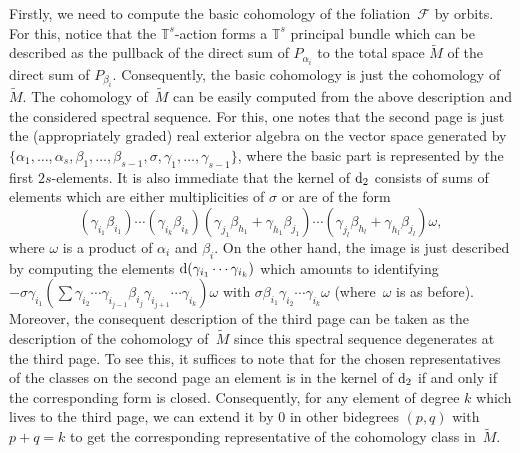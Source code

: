 \documentclass[10pt,a4paper]{amsart}
\numberwithin{equation}{section}
\theoremstyle{definition}
\begin{document}
Firstly, we need to compute the basic cohomology of the foliation~$\mathcal{F}$ by orbits. For this, notice that the $\mathbb{T}^s$-action forms a $\mathbb{T}^s$ principal bundle which can be described as the pullback of the direct sum of $P_{\alpha_i}$ to the total space $\tilde{M}$ of the direct sum of $P_{\beta_i}$. Consequently, the basic cohomology is just the cohomology of~$\tilde{M}$. The cohomology of~$\tilde{M}$ can be easily computed from the above description and the considered spectral sequence. For this, one notes that the second page is just the (appropriately graded) real exterior algebra on the vector space generated by $\{\alpha_1,\dots,\alpha_s,\beta_1,\dots,\beta_{s-1},\sigma,\gamma_1,\dots,\gamma_{s-1}\}$, where the basic part is represented by the first $2s$-elements. It is also immediate that the kernel of ${\rm d}_2$ consists of sums of elements which are either multiplicities of $\sigma$ or are of the form
\[(\gamma_{i_1}\beta_{i_1})\cdots (\gamma_{i_k}\beta_{i_k})(\gamma_{j_1}\beta_{h_1}+\gamma_{h_1}\beta_{j_1})\cdots (\gamma_{j_l}\beta_{h_l}+\gamma_{h_l}\beta_{j_l})\omega,\]
where $\omega$ is a product of $\alpha_i$ and $\beta_i$. On the other hand, the image is just described by computing the elements ${\rm d}(\gamma_{i_1}\cdots \gamma_{i_k})$ which amounts to identifying $-\sigma\gamma_{i_1}(\sum \gamma_{i_2}\cdots \gamma_{i_{j-1}}\beta_{i_j}\gamma_{i_{j+1}}\cdots \gamma_{i_k})\omega$ with $\sigma\beta_{i_1}\gamma_{i_2}\cdots \gamma_{i_k}\omega$ (where~$\omega$ is as before). Moreover, the consequent description of the third page can be taken as the description of the cohomology of~$\tilde{M}$ since this spectral sequence degenerates at the third page. To see this, it suffices to note that for the chosen representatives of the classes on the second page an element is in the kernel of ${\rm d}_2$ if and only if the corresponding form is closed. Consequently, for any element of degree $k$ which lives to the third page, we can extend it by $0$ in other bidegrees $(p,q)$ with $p+q=k$ to get the corresponding representative of the cohomology class in~$\tilde{M}$.
\end{document}
